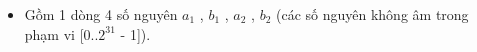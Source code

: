\begin{itemize}
	\item Gồm 1 dòng 4 số nguyên $a_{1}$ , $b_{1}$ , $a_{2}$ , $b_{2}$ (các số nguyên không âm trong phạm vi [0..$2^{31}$ - 1]).
\end{itemize}